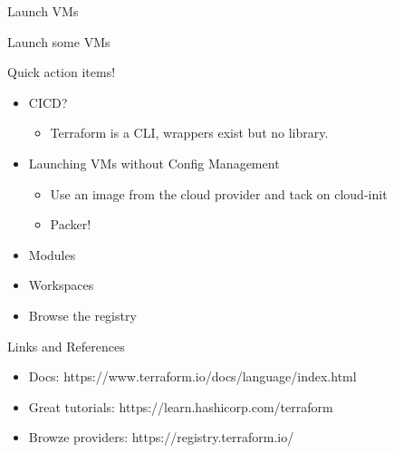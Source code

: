 \documentclass{beamer}
\begin{document}

\begin{frame}{Launch VMs}

\begin{center}
    Launch some VMs
\end{center}

\end{frame}


\begin{frame}{Quick action items!}

\begin{itemize}
    \item CICD?
    \begin{itemize}
        \item Terraform is a CLI, wrappers exist but no library.
    \end{itemize}
    \item Launching VMs without Config Management
    \begin{itemize}
        \item Use an image from the cloud provider and tack on cloud-init
        \item Packer!
    \end{itemize}
    \item Modules
    \item Workspaces
    \item Browse the registry
\end{itemize}

\end{frame}


\begin{frame}{Links and References}

\begin{itemize}
    \item Docs: https://www.terraform.io/docs/language/index.html
    \item Great tutorials: https://learn.hashicorp.com/terraform
    \item Browze providers: https://registry.terraform.io/
\end{itemize}

\end{frame}
\end{document}
